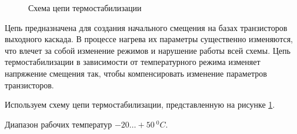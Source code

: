 \begin{figure}[!htbp]
    \caption{Схема цепи термостабилизации}
    \label{figure:p2_2}
  \end{figure}

Цепь предназначена  для  создания  начального  смещения  на базах транзисторов выходного каскада. В процессе нагрева их параметры существенно изменяются, что влечет за собой изменение режимов и нарушение работы  всей  схемы. Цепь термостабилизации  в  зависимости  от  температурного  режима  изменяет  напряжение  смещения  так,  чтобы  компенсировать  изменение  параметров  транзисторов.\par Используем схему цепи термостабилизации, представленную на рисунке \ref{figure:p2_2}.\par
  Диапазон рабочих температур $-20\ldots +50~^0C$. \par